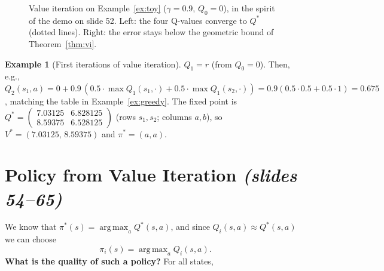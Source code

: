 \documentclass[11pt,a4paper]{article}
\DeclareMathOperator*{\argmax}{arg\,max}
\newcommand{\slides}[1]{\emph{(slides #1)}}
\theoremstyle{plain}
\theoremstyle{definition}
\newtheorem{example}[theorem]{Example}
\theoremstyle{remark}
\begin{document}
\begin{figure}[htbp]
\begin{minipage}{0.49\linewidth}
\end{minipage}
\caption{Value iteration on Example~\ref{ex:toy} ($\gamma=0.9$, $Q_0=0$), in the spirit of the demo on slide 52. Left: the four Q-values converge to $Q^*$ (dotted lines). Right: the error stays below the geometric bound of Theorem~\ref{thm:vi}.}
\label{fig:vi}
\end{figure}

\begin{example}[First iterations of value iteration]\label{ex:vi}
$Q_1=r$ (from $Q_0=0$). Then, e.g., $Q_2(s_1,a)=0+0.9\,(0.5\cdot\max Q_1(s_1,\cdot)+0.5\cdot\max Q_1(s_2,\cdot))=0.9(0.5\cdot0.5+0.5\cdot1)=0.675$, matching the table in Example~\ref{ex:greedy}. The fixed point is $Q^*=\begin{pmatrix}7.03125&6.828125\\8.59375&6.528125\end{pmatrix}$ (rows $s_1,s_2$; columns $a,b$), so $V^*=(7.03125,\,8.59375)$ and $\pi^*=(a,a)$.
\end{example}

\section{Policy from Value Iteration \slides{54--65}}\label{sec:greedy}
We know that $\pi^*(s)=\argmax_aQ^*(s,a)$, and since $Q_i(s,a)\approx Q^*(s,a)$ we can choose
\[
\pi_i(s)=\argmax_aQ_i(s,a).
\]
\textbf{What is the quality of such a policy?} For all states,
\end{document}
